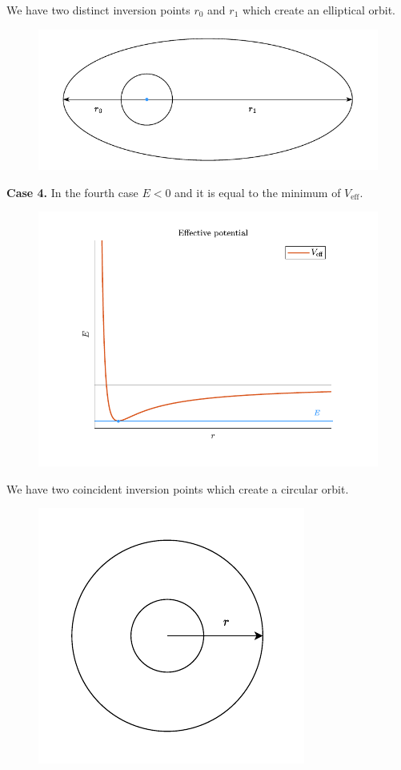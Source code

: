 We have two distinct inversion points $r_0$ and $r_1$ which create an elliptical orbit.
\begin{figure}[H]
  \centering
  \includegraphics[width=0.6\linewidth]{res/svg/elliptic_orbit_drawing.drawio}
\end{figure}
\textbf{Case 4.} In the fourth case $E<0$ and it is equal to the minimum of $V_{\text{eff}}$.
\begin{figure}[H]
  \centering
  \includegraphics[width=0.6\linewidth]{res/svg/circular_orbit.drawio}
\end{figure}
We have two coincident inversion points which create a circular orbit.
\begin{figure}[H]
  \centering
  \includegraphics[width=0.4\linewidth]{res/svg/circular_orbit_drawing.drawio}
\end{figure}
